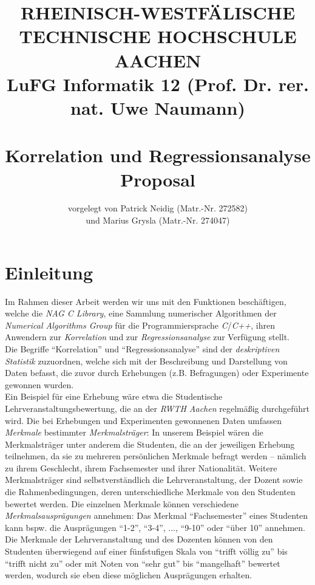 \documentclass{article}
\title{
{\bf \scriptsize RHEINISCH-WESTF\"ALISCHE TECHNISCHE HOCHSCHULE AACHEN \\
LuFG Informatik 12 (Prof. Dr. rer. nat. Uwe Naumann)}
\vspace{.5cm} \\
\epsfig{file=figures/STCE_Logo_WWW.eps,width=.7\textwidth}
\vspace{1cm} \\
{\bf \Large Korrelation und Regressionsanalyse} \\
{\large Proposal} 
}
\author{vorgelegt von Patrick Neidig (Matr.-Nr. 272582)\\
	und Marius Grysla (Matr.-Nr. 274047)}
\begin{document}


\pagestyle{headings}

\maketitle


\newpage


\section{Einleitung}
Im Rahmen dieser Arbeit werden wir uns mit den Funktionen beschäftigen, welche die {\it NAG C Library}, eine Sammlung numerischer Algorithmen der {\it Numerical Algorithms Group} für die Programmiersprache {\it C}/{\it C++}, ihren Anwendern zur {\it Korrelation} und zur {\it Regressionsanalyse} zur Verfügung stellt.\\
Die Begriffe "`Korrelation"' und "`Regressionsanalyse"' sind der {\it deskriptiven Statistik} zuzuordnen, welche sich mit der Beschreibung und Darstellung von Daten befasst, die zuvor durch Erhebungen (z.B. Befragungen) oder Experimente gewonnen wurden.\\
Ein Beispiel für eine Erhebung wäre etwa die Studentische Lehrveranstaltungsbewertung, die an der {\it RWTH Aachen} regelmäßig durchgeführt wird. Die bei Erhebungen und Experimenten gewonnenen Daten umfassen {\it Merkmale} bestimmter {\it Merkmalsträger}: In unserem Beispiel wären die Merkmalsträger unter anderem die Studenten, die an der jeweiligen Erhebung teilnehmen, da sie zu mehreren persönlichen Merkmale befragt werden -- nämlich zu ihrem Geschlecht, ihrem Fachsemester und ihrer Nationalität. Weitere Merkmalsträger sind selbstverständlich die Lehrveranstaltung, der Dozent sowie die Rahmenbedingungen, deren unterschiedliche Merkmale von den Studenten bewertet werden. Die einzelnen Merkmale können verschiedene {\it Merkmalsausprägungen} annehmen: Das Merkmal "`Fachsemester"' eines Studenten kann bspw. die Ausprägungen "`1-2"', "`3-4"', ..., "`9-10"' oder "`über 10"' annehmen. Die Merkmale der Lehrveranstaltung und des Dozenten können von den Studenten überwiegend auf einer fünfstufigen Skala von "`trifft völlig zu"' bis "`trifft nicht zu"' oder mit Noten von "`sehr gut"' bis "`mangelhaft"' bewertet werden, wodurch sie eben diese möglichen Ausprägungen erhalten.\\
\end{document}

